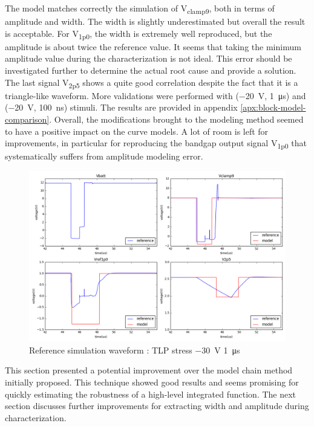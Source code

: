 The model matches correctly the simulation of V\textsubscript{clamp9}, both in terms of amplitude and width.
The width is slightly underestimated but overall the result is acceptable.
For V\textsubscript{1p0}, the width is extremely well reproduced, but the amplitude is about twice the reference value.
It seems that taking the minimum amplitude value during the characterization is not ideal.
This error should be investigated further to determine the actual root cause and provide a solution.
The last signal V\textsubscript{2p5} shows a quite good correlation despite the fact that it is a triangle-like waveform.
More validations were performed with (\SI{-20}{\volt}, \SI{1}{\micro\second}) and (\SI{-20}{\volt}, \SI{100}{\nano\second}) stimuli.
The results are provided in appendix \ref{apx:block-model-comparison}.
Overall, the modifications brought to the modeling method seemed to have a positive impact on the curve models.
A lot of room is left for improvements, in particular for reproducing the bandgap output signal V\textsubscript{1p0} that systematically suffers from amplitude modeling error.

\begin{figure}[!h]
  \centering
  \includegraphics[width=\textwidth]{src/4/figures/total_simulation_30V_1u_V2.png}
  \caption{Reference simulation waveform : TLP stress \SI{-30}{\volt} \SI{1}{\micro\second}}
  \label{fig:reference_simu_v2}
\end{figure}

This section presented a potential improvement over the model chain method initially proposed.
This technique showed good results and seems promising for quickly estimating the robustness of a high-level integrated function.
The next section discusses further improvements for extracting width and amplitude during characterization.

